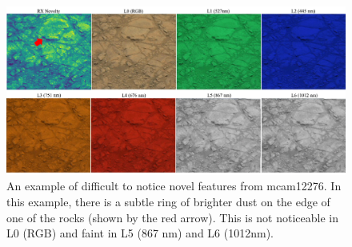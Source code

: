 \begin{figure}
\centering
\includegraphics[width=\linewidth]{figs/msl/mcam_novel.png}
\caption{An example of difficult to notice novel features from mcam12276. In this example, there is a subtle ring of brighter dust on the edge of one of the rocks (shown by the red arrow). This is not noticeable in L0 (RGB) and faint in L5 (867 nm) and L6 (1012nm).}
\label{msl/fig:mcam12276}
\end{figure}

